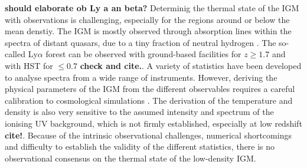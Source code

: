 \documentclass[numberedappendix]{emulateapj}
\newcommand\ALc[1]{{\color{red} \bf #1}} %
\begin{document}
\ALc{should elaborate ob Ly a an beta?}
Determinig the thermal state of the IGM with observations is challenging, especially for the regions around or below the mean denstiy. The IGM is mostly observed through absorption lines within the spectra of distant quasars,  due to a tiny fraction of neutral hydrogen \citep{1971ApJ...164L..73L}. The so-called Ly$\alpha$ forest can be observed with ground-based facilities for $z\geq 1.7$  and with HST for $\leq 0.7$ \ALc{check and cite.}. A variety of statistics have been developed to analyse spectra from a wide range of instruments. However, deriving the physical parameters of the IGM from the different observables requires a careful calibration to cosmological simulations \citep[see e.g.][]{1997ApJ...489....7R,2000MNRAS.318..817S,2013MNRAS.436.1023B,2017MNRAS.464..897B}. The derivation of the temperature and density is also very sensitive to the assumed intensity and spectrum  of the ionising UV background, which is not firmly established, especially at low redshift \ALc{cite!}.
Because of the intrinsic observational challenges, numerical shortcomings and difficulty to establish the validity of the different statistics,  there is no observational consensus on the thermal state of the low-density IGM.

\end{document}
